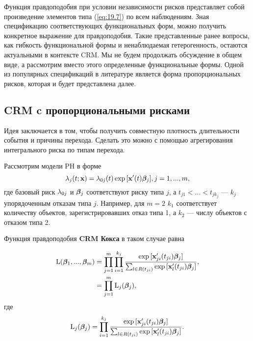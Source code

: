 Функция правдоподобия при условии независимости рисков представляет собой произведение элементов типа (\ref{eq:19.7}) по всем наблюдениям. Зная спецификацию соответствующих функциональных форм, можно получить конкретное выражение для правдоподобия. Такие представленные ранее вопросы, как гибкость функциональной формы и ненаблюдаемая гетерогенность, остаются актуальными в контексте CRM. Мы не будем продолжать обсуждение в общем виде, а рассмотрим вместо этого определенные функциональные формы. Одной из популярных спецификаций в литературе является форма пропорциональных рисков, которая и будет представлена далее.


\subsection{CRM c пропорциональными рисками}\label{sec:19.2.2}

\noindent
Идея заключается в том, чтобы получить совместную плотность длительности события и причины перехода. Сделать это можно с помощью агрегирования интегрального риска по типам перехода.

Рассмотрим модели PH в форме
    $$\lambda_j(t;\mathbf{x}) = \lambda_{0j}(t) \exp{[\mathbf{x}'(t) \bm{\beta}_j]}, j = 1,...,m,$$
где базовый риск $\lambda_{0j}$ и $\bm{\beta}_j$ соответствуют риску типа $j$, а $t_{j1} < ... < t_{jk_j}$ --- $k_j$ упорядоченным отказам типа $j$. Например, для $m = 2$ $k_1$ соответствует количеству объектов, зарегистрировавших отказ типа 1, а $k_2$ --- числу объектов с отказом типа 2.

Функция правдоподобия \textbf{CRM Кокса} в таком случае равна

    \begin{align}
    \label{eq:19.10}
    \mathrm{L}(\bm{\beta}_1,...,\bm{\beta}_m) &= \prod_{j=1}^{m} \prod_{i=1}^{k_j} \frac{\exp{[\mathbf{x}'_{ji}(t_{ji}) \bm{\beta}_j]}}{\sum_{l \in R(t_{ji})} \exp{[\mathbf{x}'_l(t_{ji})\bm{\beta}_j]}}, \\
    &= \prod_{j=1}^{m} \mathrm{L}_j(\bm{\beta}_j), \notag
    \end{align}
где
    \begin{align}
    \label{eq:19.11}
    \mathrm{L}_j(\bm{\beta}_j) = \prod_{i=1}^{k_j} \frac{\exp{[\mathbf{x}'_{ji}(t_{ji}) \bm{\beta}_j]}}{\sum_{l \in R(t_{ji})} \exp{[\mathbf{x}'_l(t_{ji})\bm{\beta}_j]}}.
    \end{align}
    
